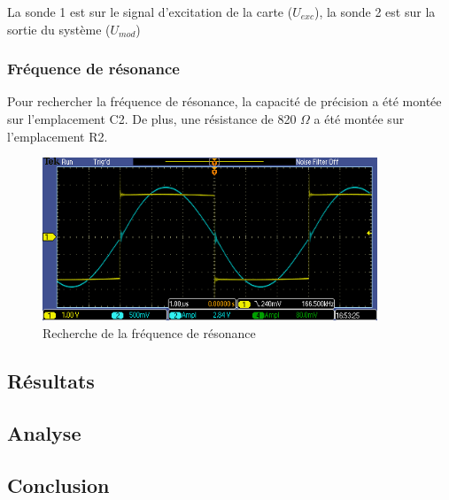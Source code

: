 La sonde 1 est sur le signal d'excitation de la carte ($U_{exc}$), la sonde 2 est sur la sortie du
système ($U_{mod}$)


\subsubsection{Fréquence de résonance}
Pour rechercher la fréquence de résonance, la capacité de précision a été montée sur l'emplacement C2.
De plus, une résistance de 820 $\Omega$ a été montée sur l'emplacement R2.
\begin{figure}[H]
    \centering
    \includegraphics[width=10cm]{Images/Seance2/TEK00000.PNG}
    \caption{Recherche de la fréquence de résonance}
    \label{fig:freq_oscillo}
\end{figure}

\subsection{Résultats}

\subsection{Analyse}

\subsection{Conclusion}
